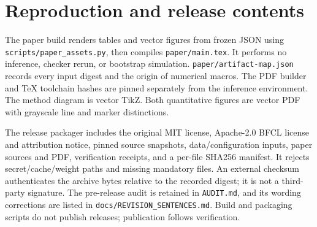 \documentclass[10pt,twocolumn]{article}
\newcommand{\code}[1]{\texttt{#1}}
\begin{document}
\FloatBarrier
\section{Reproduction and release contents}
The paper build renders tables and vector figures from frozen JSON using \code{scripts/paper\_assets.py}, then compiles \code{paper/main.tex}. It performs no inference, checker rerun, or bootstrap simulation. \code{paper/artifact-map.json} records every input digest and the origin of numerical macros. The PDF builder and TeX toolchain hashes are pinned separately from the inference environment. The method diagram is vector TikZ. Both quantitative figures are vector PDF with grayscale line and marker distinctions.

The release packager includes the original MIT license, Apache-2.0 BFCL license and attribution notice, pinned source snapshots, data/configuration inputs, paper sources and PDF, verification receipts, and a per-file SHA256 manifest. It rejects secret/cache/weight paths and missing mandatory files. An external checksum authenticates the archive bytes relative to the recorded digest; it is not a third-party signature. The pre-release audit is retained in \code{AUDIT.md}, and its wording corrections are listed in \code{docs/REVISION\_SENTENCES.md}. Build and packaging scripts do not publish releases; publication follows verification.
\end{document}
